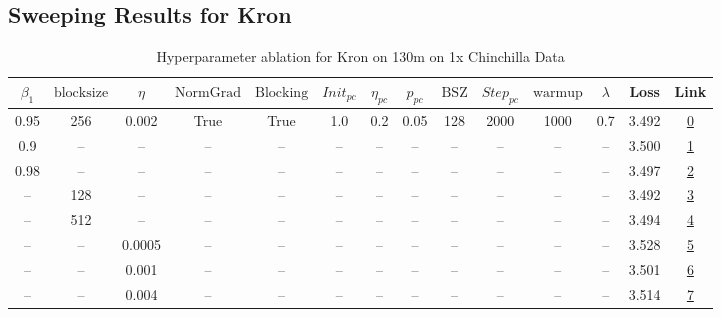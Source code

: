 \subsection{Sweeping Results for Kron}%
\begin{table}[H]
\centering
\caption{Hyperparameter ablation for Kron on 130m on 1x Chinchilla Data}
\label{tab:ablation_kron_130m_1}
\begin{tabular}{cccccccccccccc}
\toprule
$\beta_1$ & $\mathrm{block size}$ & $\eta$ & $\mathrm{NormGrad}$ & $\mathrm{Blocking}$ & $Init_{pc}$ & $\eta_{pc}$ & $p_{pc}$ & $\mathrm{BSZ}$ & $Step_{pc}$ & $\mathrm{warmup}$ & $\lambda$ & Loss & Link \\
\midrule
0.95 & 256 & 0.002 & True & True & 1.0 & 0.2 & 0.05 & 128 & 2000 & 1000 & 0.7 & 3.492 & \href{https://wandb.ai/stanford-mercury/optimizer-scaling/runs/sweep-130m-2B-kron811b3clr0.002-wd0.7-b10.95-plr0.2-pis1-gn1-nor-45d11f}{0} \\
\midrule
0.9 & -- & -- & -- & -- & -- & -- & -- & -- & -- & -- & -- & 3.500 & \href{https://wandb.ai/stanford-mercury/optimizer-scaling/runs/sweep-130m-2B-kron18ad0flr0.002-wd0.7-b10.9-plr0.2-pis1-gn1-norm-7cd768}{1} \\
0.98 & -- & -- & -- & -- & -- & -- & -- & -- & -- & -- & -- & 3.497 & \href{https://wandb.ai/stanford-mercury/optimizer-scaling/runs/sweep-130m-2B-kron13e12blr0.002-wd0.7-b10.98-plr0.2-pis1-gn1-nor-259ac0}{2} \\
-- & 128 & -- & -- & -- & -- & -- & -- & -- & -- & -- & -- & 3.492 & \href{https://wandb.ai/stanford-mercury/optimizer-scaling/runs/sweep-130m-2B-kroncd6d30lr0.002-wd0.7-b10.95-plr0.2-pis1-gn1-nor-1527d0}{3} \\
-- & 512 & -- & -- & -- & -- & -- & -- & -- & -- & -- & -- & 3.494 & \href{https://wandb.ai/stanford-mercury/optimizer-scaling/runs/sweep-130m-2B-krond41926lr0.002-wd0.7-b10.95-plr0.2-pis1-gn1-nor-e72480}{4} \\
-- & -- & 0.0005 & -- & -- & -- & -- & -- & -- & -- & -- & -- & 3.528 & \href{https://wandb.ai/stanford-mercury/optimizer-scaling/runs/sweep-130m-2B-kron6787f2lr0.0005-wd0.7-b10.95-plr0.2-pis1-gn1-no-d99f80}{5} \\
-- & -- & 0.001 & -- & -- & -- & -- & -- & -- & -- & -- & -- & 3.501 & \href{https://wandb.ai/stanford-mercury/optimizer-scaling/runs/sweep-130m-2B-kron5fbd9blr0.001-wd0.7-b10.95-plr0.2-pis1-gn1-nor-fbd5ad}{6} \\
-- & -- & 0.004 & -- & -- & -- & -- & -- & -- & -- & -- & -- & 3.514 & \href{https://wandb.ai/stanford-mercury/optimizer-scaling/runs/sweep-130m-2B-krone14983lr0.004-wd0.7-b10.95-plr0.2-pis1-gn1-nor-0f833d}{7} \\

\end{tabular}
\end{table}
